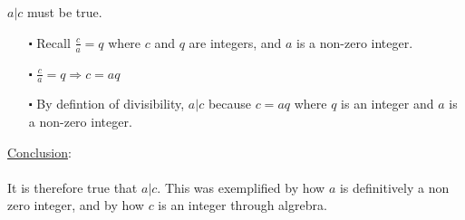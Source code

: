\documentclass[12pt]{article}
\begin{document}
\newblock
\\ \\
$a|c$ must be true.
\begin{itemize}
  \item [$\centerdot$] Recall $\frac{c}{a}=q$ where $c$ and $q$ are integers, and $a$ is a non-zero integer.
  \item [$\centerdot$] $\frac{c}{a}=q \Rightarrow c=aq$
  \item [$\centerdot$] By defintion of divisibility, $a|c$ because $c=aq$ where $q$ is an integer and $a$ is a non-zero integer.
\end{itemize}
\underline{Conclusion}:
\\ \\
It is therefore true that $a|c$. 
This was exemplified by how $a$ is definitively a non zero integer,
and by how $c$ is an integer through algrebra.
\end{document}

